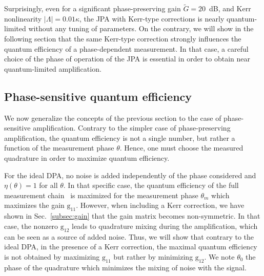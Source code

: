 \documentclass[pra,twocolumn,superscriptaddress]{revtex4-1}
\newcommand{\Grm}[0]{\mathrm{g}}
\begin{document}
Surprisingly, even for a significant phase-preserving gain $\tilde{G}=20$~dB,  and Kerr nonlinearity $|\Lambda| = 0.01 \kappa$, the JPA with Kerr-type corrections is nearly quantum-limited without any tuning of parameters. On the contrary, we will show in the following section that the same Kerr-type correction strongly influences the quantum efficiency of a phase-dependent measurement. In that case, a careful choice of the phase of operation of the JPA is essential in order to obtain near quantum-limited amplification.

\subsection{Phase-sensitive quantum efficiency \label{subsec:phaseEta}} 
We now generalize the concepts of the previous section to the case of phase-sensitive amplification. Contrary to the simpler case of phase-preserving amplification, the quantum efficiency is not a single number, but rather a function of the measurement phase $\theta$. Hence, one must choose the measured quadrature in order to maximize quantum efficiency.

For the ideal DPA, no noise is added independently of the phase considered and $\eta(\theta)=1$ for all $\theta$. In that specific case, the quantum efficiency of the full measurement chain~\cite{pozar1997} is maximized for the measurement phase $\theta_m$ which maximizes the gain $\Grm_{11}$.
% 
However, when including a Kerr correction, we have shown in Sec.~\ref{subsec:gain} that the gain matrix becomes non-symmetric. In that case, the nonzero $\mathrm{g}_{12}$ leads to quadrature mixing during the amplification, which can be seen as a source of added noise.
% 
Thus, we will show that contrary to the ideal DPA, in the presence of a Kerr correction, the maximal quantum efficiency is not obtained by maximizing $\Grm_{11}$  but rather by minimizing $\Grm_{12}$. We note $\theta_0$ the phase of the quadrature which minimizes the mixing of noise with the signal. 
\end{document}
